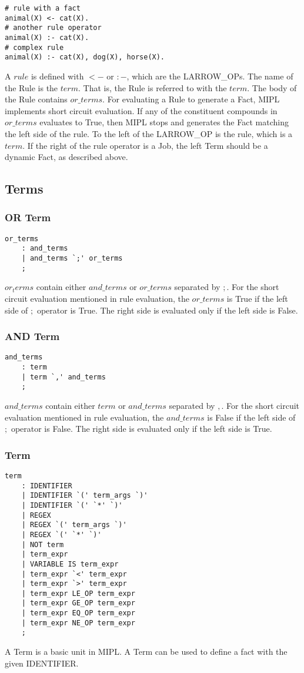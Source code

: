 \documentclass[prodmode,acmtecs]{acmsmall}
\begin{document}
\begin{lstlisting}
# rule with a fact
animal(X) <- cat(X).
# another rule operator
animal(X) :- cat(X).
# complex rule
animal(X) :- cat(X), dog(X), horse(X).
\end{lstlisting}

A $rule$ is defined with $<-$ or $:-$, which are the LARROW\_OPs. The name of the 
Rule is the $term$. That is, the Rule is referred to with the $term$.
The body of the Rule contains $or\_terms$. For evaluating a Rule to generate a Fact,
MIPL implements short circuit evaluation. If any of the constituent compounds in
$or\_terms$ evaluates to True, then MIPL stops and generates the Fact matching the
left side of the rule. To the left of the LARROW\_OP is the rule, which is a $term$. 
If the right of the rule operator is a Job, the left Term should be a dynamic Fact, 
as described above.
\medskip

\subsection{Terms}
\subsubsection{OR Term}
\begin{lstlisting}
or_terms
	: and_terms
	| and_terms `;' or_terms
	;
\end{lstlisting}
$or_terms$ contain either $and\_terms$ or $or\_terms$ separated by $;$. 
For the short circuit evaluation mentioned in rule evaluation, the $or\_terms$
is True if the left side of $;$ operator is True. The right side is evaluated
only if the left side is False.

\medskip

\subsubsection{AND Term}
\begin{lstlisting}
and_terms
	: term
	| term `,' and_terms
	;
\end{lstlisting}
$and\_terms$ contain either $term$ or $and\_terms$ separated by $,$. 
For the short circuit evaluation mentioned in rule evaluation, the $and\_terms$
is False if the left side of $;$ operator is False. The right side is evaluated
only if the left side is True.
\medskip

\subsubsection{Term}
\begin{lstlisting}
term
	: IDENTIFIER		
	| IDENTIFIER `(' term_args `)'
	| IDENTIFIER `(' `*' `)'
	| REGEX			
	| REGEX `(' term_args `)'
	| REGEX `(' `*' `)'	
	| NOT term		
	| term_expr		
	| VARIABLE IS term_expr
	| term_expr `<' term_expr
	| term_expr `>' term_expr
	| term_expr LE_OP term_expr
	| term_expr GE_OP term_expr
	| term_expr EQ_OP term_expr
	| term_expr NE_OP term_expr
	;
\end{lstlisting}
A Term is a basic unit in MIPL. A Term can be used to define a fact with the
given IDENTIFIER.
\medskip
\end{document}
